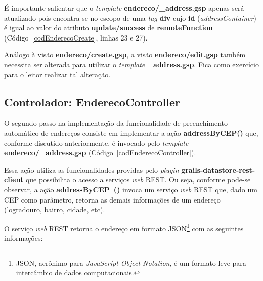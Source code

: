 É importante salientar que  o {\it template} {\bf endereco/\_address.gsp} apenas
será atualizado pois encontra-se no escopo  de uma {\it tag} {\bf div} cujo {\bf
  id} ({\it addressContainer}) é igual ao valor do atributo {\bf update/success}
de {\bf remoteFunction} (Código~\ref{codEnderecoCreate}, linhas 23 e 27). 

\vspace{0.2cm}

\begin{remark}
Análogo  à  visão {\bf  endereco/create.gsp},  a  visão {\bf  endereco/edit.gsp}
também   necessita  ser   alterada   para  utilizar   o   {\it  template}   {\bf
  \_address.gsp}.  Fica como exercício para o leitor realizar tal alteração. 
\end{remark}

\newpage

\subsection{Controlador: EnderecoController}
\label{secEnderecoController}

\vspace{0.5cm}

O segundo  passo na implementação da funcionalidade  de preenchimento automático
de endereços consiste  em implementar a ação {\bf  addressByCEP()} que, conforme
discutido    anteriormente,    é    invocado    pelo   {\it    template}    {\bf
  endereco/\_address.gsp} (Código~\ref{codEnderecoController}). 

\vspace{0.2cm}


Essa  ação   utiliza  as  funcionalidades   providas  pelo  {\it   plugin}  {\bf
  grails-datastore-rest-client} que  possibilita o  acesso a serviços  {\it web}
REST.  Ou seja, conforme pode-se observar, a ação {\bf addressByCEP~()} invoca um
serviço  {\it web}  REST que,  dado  um CEP  como parâmetro,  retorna as  demais
informações de um endereço (logradouro, bairro, cidade, etc).  

\vspace{0.2cm}

O  serviço {\it  web} REST  retorna  o endereço  em formato  JSON\footnote{JSON,
  acrônimo  para  {\it JavaScript  Object  Notation},  é  um formato  leve  para
  intercâmbio de dados computacionais.} com as seguintes informações: 

